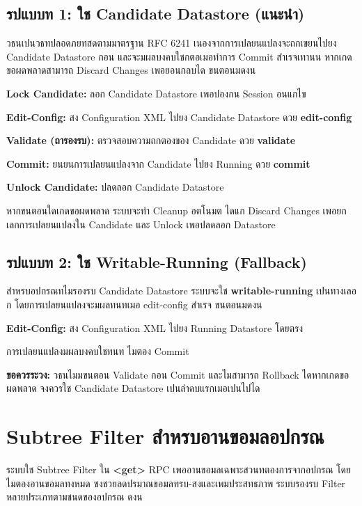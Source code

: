 \subsection{รปแบบท 1: ใช Candidate Datastore (แนะนำ)}
\hspace*{1.3em}
วธนเปนวธทปลอดภยทสดตามมาตรฐาน RFC 6241 เนองจากการเปลยนแปลงจะถกเขยนไปยง Candidate Datastore กอน และจะมผลบงคบใชกตอเมอทำการ Commit สำเรจเทานน หากเกดขอผดพลาดสามารถ Discard Changes เพอยอนกลบได ขนตอนมดงน

\begin{mycustomenum2}
    \item \textbf{Lock Candidate:} ลอก Candidate Datastore เพอปองกน Session อนแกไข
    \item \textbf{Edit-Config:} สง Configuration XML ไปยง Candidate Datastore ดวย \textbf{edit-config}
    \item \textbf{Validate (ถารองรบ):} ตรวจสอบความถกตองของ Candidate ดวย \textbf{validate}
    \item \textbf{Commit:} ยนยนการเปลยนแปลงจาก Candidate ไปยง Running ดวย \textbf{commit}
    \item \textbf{Unlock Candidate:} ปลดลอก Candidate Datastore
\end{mycustomenum2}

\hspace*{1.3em}
หากขนตอนใดเกดขอผดพลาด ระบบจะทำ Cleanup อตโนมต ไดแก Discard Changes เพอยกเลกการเปลยนแปลงใน Candidate และ Unlock เพอปลดลอก Datastore

\subsection{รปแบบท 2: ใช Writable-Running (Fallback)}
\hspace*{1.3em}
สำหรบอปกรณทไมรองรบ Candidate Datastore ระบบจะใช \textbf{writable-running} เปนทางเลอก โดยการเปลยนแปลงจะมผลทนทเมอ edit-config สำเรจ ขนตอนมดงน

\begin{mycustomenum2}
    \item \textbf{Edit-Config:} สง Configuration XML ไปยง Running Datastore โดยตรง
    \item การเปลยนแปลงมผลบงคบใชทนท ไมตอง Commit
\end{mycustomenum2}

\hspace*{1.3em}
\textbf{ขอควรระวง:} วธนไมมขนตอน Validate กอน Commit และไมสามารถ Rollback ไดหากเกดขอผดพลาด จงควรใช Candidate Datastore เปนลำดบแรกเมอเปนไปได

\section{Subtree Filter สำหรบอานขอมลอปกรณ}
\hspace*{1.3em}
ระบบใช Subtree Filter ใน \textbf{<get>} RPC เพออานขอมลเฉพาะสวนทตองการจากอปกรณ โดยไมตองอานขอมลทงหมด ซงชวยลดปรมาณขอมลทรบ-สงและเพมประสทธภาพ ระบบรองรบ Filter หลายประเภทตามชนดของอปกรณ ดงน

